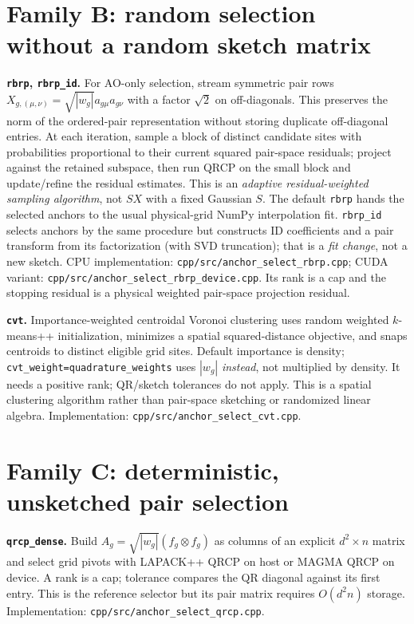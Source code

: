 \documentclass[10pt,a4paper]{article}
\newcommand{\code}[1]{\texttt{#1}}
\begin{document}
\section{Family B: random selection without a random sketch matrix}
\textbf{\code{rbrp}, \code{rbrp\_id}.} For AO-only selection, stream symmetric
pair rows
$X_{g,(\mu,\nu)}=\sqrt{|w_g|}a_{g\mu}a_{g\nu}$ with a factor $\sqrt2$
on off-diagonals. This preserves the norm of the ordered-pair representation
without storing duplicate off-diagonal entries. At each iteration, sample a
block of distinct candidate sites with probabilities proportional to their
current squared pair-space residuals; project against the retained subspace,
then run QRCP on the small block and update/refine the residual estimates.
This is an \emph{adaptive residual-weighted sampling algorithm}, not
$S X$ with a fixed Gaussian $S$. The default \code{rbrp} hands the selected
anchors to the usual physical-grid NumPy interpolation fit. \code{rbrp\_id}
selects anchors by the same procedure but constructs ID coefficients and a
pair transform from its factorization (with SVD truncation); that is a
\emph{fit change}, not a new sketch. CPU implementation:
\code{cpp/src/anchor\_select\_rbrp.cpp}; CUDA variant:
\code{cpp/src/anchor\_select\_rbrp\_device.cpp}. Its rank is a cap and the
stopping residual is a physical weighted pair-space projection residual.

\textbf{\code{cvt}.} Importance-weighted centroidal Voronoi clustering uses
random weighted $k$-means++ initialization, minimizes a spatial squared-distance
objective, and snaps centroids to distinct eligible grid sites. Default
importance is density; \code{cvt\_weight=quadrature\_weights} uses $|w_g|$
\emph{instead}, not multiplied by density. It needs a positive rank; QR/sketch
tolerances do not apply. This is a spatial clustering algorithm rather than
pair-space sketching or randomized linear algebra. Implementation:
\code{cpp/src/anchor\_select\_cvt.cpp}.

\section{Family C: deterministic, unsketched pair selection}
\textbf{\code{qrcp\_dense}.} Build $A_g=\sqrt{|w_g|}(f_g\otimes f_g)$ as columns of
an explicit $d^2\times n$ matrix and select grid pivots with LAPACK++ QRCP on
host or MAGMA QRCP on device. A rank is a cap; tolerance compares the QR
diagonal against its first entry. This is the reference selector but its pair
matrix requires $O(d^2n)$ storage. Implementation:
\code{cpp/src/anchor\_select\_qrcp.cpp}.
\end{document}
